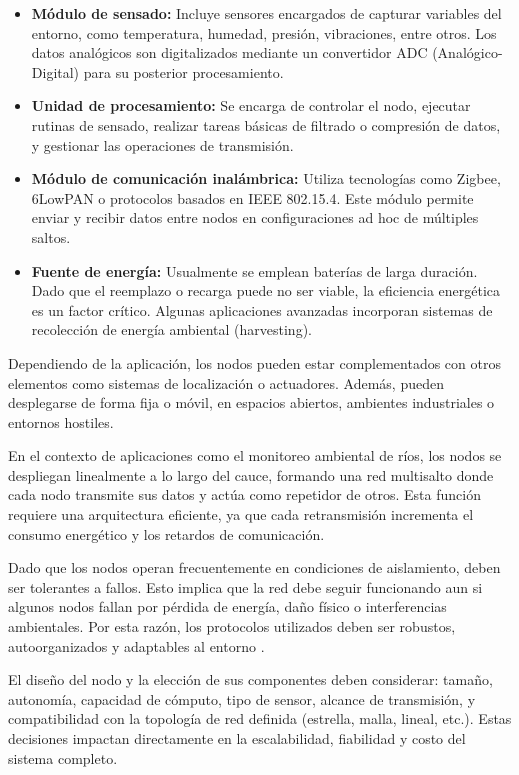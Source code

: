 \begin{itemize}
    \item \textbf{Módulo de sensado:} Incluye sensores encargados de capturar variables del entorno, como temperatura, humedad, presión, vibraciones, entre otros. Los datos analógicos son digitalizados mediante un convertidor ADC (Analógico-Digital) para su posterior procesamiento.
    
    \item \textbf{Unidad de procesamiento:} Se encarga de controlar el nodo, ejecutar rutinas de sensado, realizar tareas básicas de filtrado o compresión de datos, y gestionar las operaciones de transmisión.
    
    \item \textbf{Módulo de comunicación inalámbrica:} Utiliza tecnologías como Zigbee, 6LowPAN o protocolos basados en IEEE 802.15.4. Este módulo permite enviar y recibir datos entre nodos en configuraciones ad hoc de múltiples saltos.
    
    \item \textbf{Fuente de energía:} Usualmente se emplean baterías de larga duración. Dado que el reemplazo o recarga puede no ser viable, la eficiencia energética es un factor crítico. Algunas aplicaciones avanzadas incorporan sistemas de recolección de energía ambiental (harvesting).
\end{itemize}

Dependiendo de la aplicación, los nodos pueden estar complementados con otros elementos como sistemas de localización o actuadores. Además, pueden desplegarse de forma fija o móvil, en espacios abiertos, ambientes industriales o entornos hostiles.

En el contexto de aplicaciones como el monitoreo ambiental de ríos, los nodos se despliegan linealmente a lo largo del cauce, formando una red multisalto donde cada nodo transmite sus datos y actúa como repetidor de otros. Esta función requiere una arquitectura eficiente, ya que cada retransmisión incrementa el consumo energético y los retardos de comunicación.

Dado que los nodos operan frecuentemente en condiciones de aislamiento, deben ser tolerantes a fallos. Esto implica que la red debe seguir funcionando aun si algunos nodos fallan por pérdida de energía, daño físico o interferencias ambientales. Por esta razón, los protocolos utilizados deben ser robustos, autoorganizados y adaptables al entorno \cite{perez2014metodologia}.

El diseño del nodo y la elección de sus componentes deben considerar: tamaño, autonomía, capacidad de cómputo, tipo de sensor, alcance de transmisión, y compatibilidad con la topología de red definida (estrella, malla, lineal, etc.). Estas decisiones impactan directamente en la escalabilidad, fiabilidad y costo del sistema completo.

